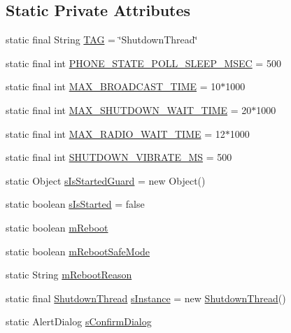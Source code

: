 \subsection*{Static Private Attributes}
\begin{DoxyCompactItemize}
\item 
static final String \hyperlink{classcom_1_1android_1_1server_1_1power_1_1ShutdownThread_a1ab8709099d9b2c4801f53c83fec1b62}{T\-A\-G} = \char`\"{}Shutdown\-Thread\char`\"{}
\item 
static final int \hyperlink{classcom_1_1android_1_1server_1_1power_1_1ShutdownThread_a6d2e9f39fe896054b1039c10f8807f46}{P\-H\-O\-N\-E\-\_\-\-S\-T\-A\-T\-E\-\_\-\-P\-O\-L\-L\-\_\-\-S\-L\-E\-E\-P\-\_\-\-M\-S\-E\-C} = 500
\item 
static final int \hyperlink{classcom_1_1android_1_1server_1_1power_1_1ShutdownThread_a8234e4bba463ba0f804c110bf26230fa}{M\-A\-X\-\_\-\-B\-R\-O\-A\-D\-C\-A\-S\-T\-\_\-\-T\-I\-M\-E} = 10$\ast$1000
\item 
static final int \hyperlink{classcom_1_1android_1_1server_1_1power_1_1ShutdownThread_aeb0cc4ef0050f1234bf21dc3303d1fbd}{M\-A\-X\-\_\-\-S\-H\-U\-T\-D\-O\-W\-N\-\_\-\-W\-A\-I\-T\-\_\-\-T\-I\-M\-E} = 20$\ast$1000
\item 
static final int \hyperlink{classcom_1_1android_1_1server_1_1power_1_1ShutdownThread_ad778e09c18def65b74e379fc02f7f759}{M\-A\-X\-\_\-\-R\-A\-D\-I\-O\-\_\-\-W\-A\-I\-T\-\_\-\-T\-I\-M\-E} = 12$\ast$1000
\item 
static final int \hyperlink{classcom_1_1android_1_1server_1_1power_1_1ShutdownThread_a69722120b27aecc2793edcf056ce05f0}{S\-H\-U\-T\-D\-O\-W\-N\-\_\-\-V\-I\-B\-R\-A\-T\-E\-\_\-\-M\-S} = 500
\item 
static Object \hyperlink{classcom_1_1android_1_1server_1_1power_1_1ShutdownThread_a344f93b812c042e19cc4311ba5cf225c}{s\-Is\-Started\-Guard} = new Object()
\item 
static boolean \hyperlink{classcom_1_1android_1_1server_1_1power_1_1ShutdownThread_a36768af512dd5feedfa2f3865ed93aab}{s\-Is\-Started} = false
\item 
static boolean \hyperlink{classcom_1_1android_1_1server_1_1power_1_1ShutdownThread_a839fbc9d1b2f281fbfe8b7d7b48b5dec}{m\-Reboot}
\item 
static boolean \hyperlink{classcom_1_1android_1_1server_1_1power_1_1ShutdownThread_ae7e6a7618312de5f14ad445a22cea34a}{m\-Reboot\-Safe\-Mode}
\item 
static String \hyperlink{classcom_1_1android_1_1server_1_1power_1_1ShutdownThread_a3ffbd225605d2f613ead357334088772}{m\-Reboot\-Reason}
\item 
static final \hyperlink{classcom_1_1android_1_1server_1_1power_1_1ShutdownThread}{Shutdown\-Thread} \hyperlink{classcom_1_1android_1_1server_1_1power_1_1ShutdownThread_aed796d70186e3e40dc44db84ba585e8f}{s\-Instance} = new \hyperlink{classcom_1_1android_1_1server_1_1power_1_1ShutdownThread}{Shutdown\-Thread}()
\item 
static Alert\-Dialog \hyperlink{classcom_1_1android_1_1server_1_1power_1_1ShutdownThread_ade9a17e263694492d29c72670aab66f5}{s\-Confirm\-Dialog}
\end{DoxyCompactItemize}


